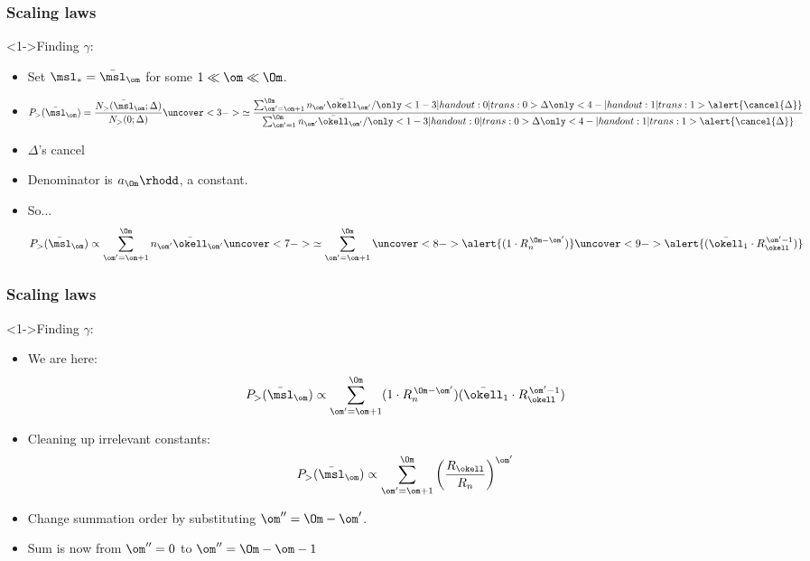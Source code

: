 \begin{frame}[label=]
  \frametitle{Scaling laws}

  \begin{block}<1->{Finding $\gamma$:}
    \begin{itemize}
    \item<1-> Set $\msl_\ast = \bar{\msl}_\om$ for some $1 \ll \om \ll \Om$.
    \item<2->
      $$
      P_> (\bar{\msl}_\om)
      =
      \frac
      {N_> (\bar{\msl}_\om; \Delta)}
      {N_> (0; \Delta)}
      \uncover<3->{
        \simeq
        \frac
        {
          \sum_{\om'=\om+1}^{\Om} n_{\om'}
          \bar{\okell}_{\om'}/\only<1-3 | handout:0 | trans:0>{\Delta}\only<4- | handout:1 | trans:1>{\alert{\cancel{\Delta}}}
        }
        {
          \sum_{\om'=1}^{\Om} n_{\om'} \bar{\okell}_{\om'}/\only<1-3 | handout:0 | trans:0>{\Delta}\only<4- | handout:1 | trans:1>{\alert{\cancel{\Delta}}}
        }
      }
      $$
    \item<4->
      $\Delta$'s cancel
    \item<5-> 
      Denominator is $a_\Om \rhodd$, a constant.
    \item<6->
      So...  
      $$
      P_> (\bar{\msl}_\om)
      \propto
      \sum_{\om'=\om+1}^{\Om} n_{\om'} \bar{\okell}_{\om'}
      \uncover<7->{
        \simeq
        \sum_{\om'=\om+1}^{\Om} 
        \uncover<8->{\alert{(1\cdot R_n^{\, \Om-\om'})}}
        \uncover<9->{\alert{(\bar{\okell}_{1} \cdot R_\okell^{\, \om'-1})}}
      }
      $$
    \end{itemize}
  \end{block}

\end{frame}

\begin{frame}[label=]
  \frametitle{Scaling laws}

  \begin{block}<1->{Finding $\gamma$:}
    \begin{itemize}
    \item<1-> We are here:
      $$
      P_> (\bar{\msl}_\om)
      \propto
      \sum_{\om'=\om+1}^{\Om} 
      (1 \cdot R_n^{\, \Om-\om'})
      (\bar{\okell}_1 \cdot R_\okell^{\, \om'-1})
      $$
    \item<2-> Cleaning up irrelevant constants:
      $$
      P_> (\bar{\msl}_\om)
      \propto
      \sum_{\om'=\om+1}^{\Om} 
      \left(
        \frac{R_\okell}{R_n}
      \right)^{\om'}
      $$
    \item<3-> Change summation order by substituting $\om'' = \Om - \om'$.
    \item<4-> Sum is now from $\om''=0$ to $\om'' = \Om - \om - 1$
    \end{itemize}
  \end{block}

\end{frame}

